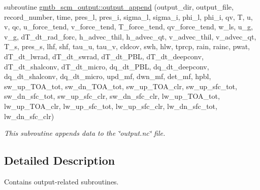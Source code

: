{\bf }\par
\begin{DoxyCompactItemize}
\item 
subroutine \hyperlink{group__output_gab0bd4f42c7b5f1cafe9879343e860d8b}{gmtb\+\_\+scm\+\_\+output\+::output\+\_\+append} (output\+\_\+dir, output\+\_\+file, record\+\_\+number, time, pres\+\_\+l, pres\+\_\+i, sigma\+\_\+l, sigma\+\_\+i, phi\+\_\+l, phi\+\_\+i, qv, T, u, v, qc,   u\+\_\+force\+\_\+tend, v\+\_\+force\+\_\+tend, T\+\_\+force\+\_\+tend, qv\+\_\+force\+\_\+tend, w\+\_\+ls, u\+\_\+g, v\+\_\+g, d\+T\+\_\+dt\+\_\+rad\+\_\+forc, h\+\_\+advec\+\_\+thil, h\+\_\+advec\+\_\+qt, v\+\_\+advec\+\_\+thil,   v\+\_\+advec\+\_\+qt, T\+\_\+s, pres\+\_\+s, lhf, shf, tau\+\_\+u, tau\+\_\+v, cldcov, swh, hlw, tprcp, rain, rainc, pwat, d\+T\+\_\+dt\+\_\+lwrad, d\+T\+\_\+dt\+\_\+swrad, d\+T\+\_\+dt\+\_\+\+P\+BL, d\+T\+\_\+dt\+\_\+deepconv, d\+T\+\_\+dt\+\_\+shalconv, d\+T\+\_\+dt\+\_\+micro, dq\+\_\+dt\+\_\+\+P\+BL, dq\+\_\+dt\+\_\+deepconv, dq\+\_\+dt\+\_\+shalconv, dq\+\_\+dt\+\_\+micro, upd\+\_\+mf, dwn\+\_\+mf, det\+\_\+mf,   hpbl, sw\+\_\+up\+\_\+\+T\+O\+A\+\_\+tot, sw\+\_\+dn\+\_\+\+T\+O\+A\+\_\+tot, sw\+\_\+up\+\_\+\+T\+O\+A\+\_\+clr, sw\+\_\+up\+\_\+sfc\+\_\+tot, sw\+\_\+dn\+\_\+sfc\+\_\+tot, sw\+\_\+up\+\_\+sfc\+\_\+clr, sw\+\_\+dn\+\_\+sfc\+\_\+clr, lw\+\_\+up\+\_\+\+T\+O\+A\+\_\+tot,   lw\+\_\+up\+\_\+\+T\+O\+A\+\_\+clr, lw\+\_\+up\+\_\+sfc\+\_\+tot, lw\+\_\+up\+\_\+sfc\+\_\+clr, lw\+\_\+dn\+\_\+sfc\+\_\+tot, lw\+\_\+dn\+\_\+sfc\+\_\+clr)
\begin{DoxyCompactList}\small\item\em This subroutine appends data to the \char`\"{}output.\+nc\char`\"{} file. \end{DoxyCompactList}\end{DoxyCompactItemize}



\subsection{Detailed Description}
Contains output-\/related subroutines. 

